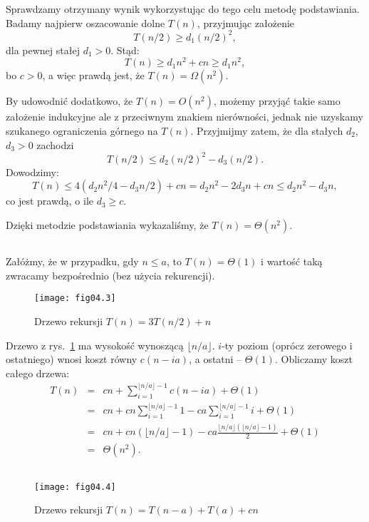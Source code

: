 Sprawdzamy otrzymany wynik wykorzystując do tego celu metodę podstawiania. Badamy najpierw oszacowanie dolne $T(n)$, przyjmując założenie
\[
	T(n/2) \ge d_1(n/2)^2,
\]
dla pewnej stałej $d_1>0$. Stąd:
\[
	T(n) \ge d_1n^2+cn \ge d_1n^2, 
\]
bo $c>0$, a więc prawdą jest, że $T(n)=\Omega(n^2)$.

By udowodnić dodatkowo, że $T(n)=O(n^2)$, możemy przyjąć takie samo założenie indukcyjne ale z przeciwnym znakiem nierówności, jednak nie uzyskamy szukanego ograniczenia górnego na $T(n)$. Przyjmijmy zatem, że dla stałych $d_2$,~$d_3>0$ zachodzi
\[
	T(n/2) \le d_2(n/2)^2-d_3(n/2).
\]
Dowodzimy:
\[
	T(n) \le 4(d_2n^2\!/4-d_3n/2)+cn = d_2n^2-2d_3n+cn \le d_2n^2-d_3n,
\]
co jest prawdą, o ile $d_3\ge c$.

Dzięki metodzie podstawiania wykazaliśmy, że $T(n)=\Theta(n^2)$.

\subsection{} %
Załóżmy, że w przypadku, gdy $n\le a$, to $T(n)=\Theta(1)$ i wartość taką zwracamy bezpośrednio (bez użycia rekurencji).
\begin{figure}[h]
	\begin{center}
		\texttt{[image: fig04.3]}
	\end{center}
	\caption{Drzewo rekursji $T(n)=3T(n/2)+n$} \label{fig:4.2-4}
\end{figure}
Drzewo z rys.~\ref{fig:4.2-4} ma wysokość wynoszącą $\lfloor n/a\rfloor$. $i$-ty poziom (oprócz zerowego i ostatniego) wnosi koszt równy $c(n-ia)$, a ostatni -- $\Theta(1)$. Obliczamy koszt całego drzewa:
\begin{eqnarray*}
	T(n) &=& cn+\sum_{i=1}^{\lfloor n/a\rfloor-1}c(n-ia)+\Theta(1) \\
	&=& cn+cn\sum_{i=1}^{\lfloor n/a\rfloor-1}1-ca\sum_{i=1}^{\lfloor n/a\rfloor-1}i+\Theta(1) \\
	&=& cn+cn(\lfloor n/a\rfloor-1)-ca\frac{\lfloor n/a\rfloor(\lfloor n/a\rfloor-1)}{2}+\Theta(1) \\
	&=& \Theta(n^2).
\end{eqnarray*}

\subsection{} %
\begin{figure}[h]
	\begin{center}
		\texttt{[image: fig04.4]}
	\end{center}
	\caption{Drzewo rekursji $T(n)=T(n-a)+T(a)+cn$} \label{fig:4.2-5}
\end{figure}

